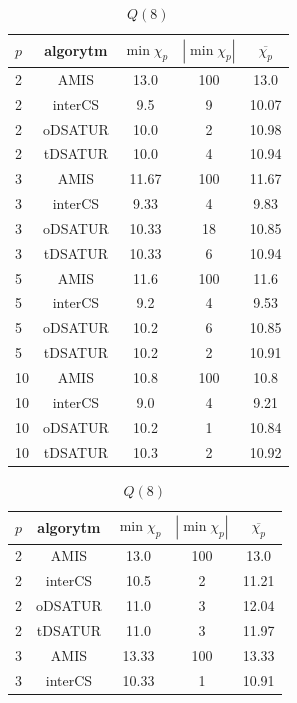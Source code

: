 \documentclass[10pt,a4paper]{article}
\begin{document}
\begin{table}[H]
\begin{minipage}{.5\linewidth}
			\caption{$Q(7)$}
		\end{minipage}
		\begin{minipage}{.5\linewidth}
			\centering
			\begin{tabular}{|l|c|c|c|c|}
				\hline
				\textbf{$p$} & \textbf{algorytm} & \textbf{$\min \chi_{p}$} & \textbf{$|\min \chi_{p}|$} & \textbf{$\overline{\chi_{p}}$} \\
				\hline
				2 & AMIS & 13.0 & 100 & 13.0 \\
				2 & interCS & 9.5 & 9 & 10.07 \\
				2 & oDSATUR & 10.0 & 2 & 10.98 \\
				2 & tDSATUR & 10.0 & 4 & 10.94 \\
				\hline
				3 & AMIS & 11.67 & 100 & 11.67 \\
				3 & interCS & 9.33 & 4 & 9.83 \\
				3 & oDSATUR & 10.33 & 18 & 10.85 \\
				3 & tDSATUR & 10.33 & 6 & 10.94 \\
				\hline
				5 & AMIS & 11.6 & 100 & 11.6 \\
				5 & interCS & 9.2 & 4 & 9.53 \\
				5 & oDSATUR & 10.2 & 6 & 10.85 \\
				5 & tDSATUR & 10.2 & 2 & 10.91 \\
				\hline
				10 & AMIS & 10.8 & 100 & 10.8 \\
				10 & interCS & 9.0 & 4 & 9.21 \\
				10 & oDSATUR & 10.2 & 1 & 10.84 \\
				10 & tDSATUR & 10.3 & 2 & 10.92 \\
				\hline
			\end{tabular}
			\caption{$Q(8)$}
		\end{minipage}
		\begin{minipage}{.5\linewidth}
			\centering
			\begin{tabular}{|l|c|c|c|c|}
				\hline
				\textbf{$p$} & \textbf{algorytm} & \textbf{$\min \chi_{p}$} & \textbf{$|\min \chi_{p}|$} & \textbf{$\overline{\chi_{p}}$} \\
				\hline
				2 & AMIS & 13.0 & 100 & 13.0 \\
				2 & interCS & 10.5 & 2 & 11.21 \\
				2 & oDSATUR & 11.0 & 3 & 12.04 \\
				2 & tDSATUR & 11.0 & 3 & 11.97 \\
				\hline
				3 & AMIS & 13.33 & 100 & 13.33 \\
				3 & interCS & 10.33 & 1 & 10.91 \\

\end{tabular}
\end{minipage}
\end{table}
\end{document}
